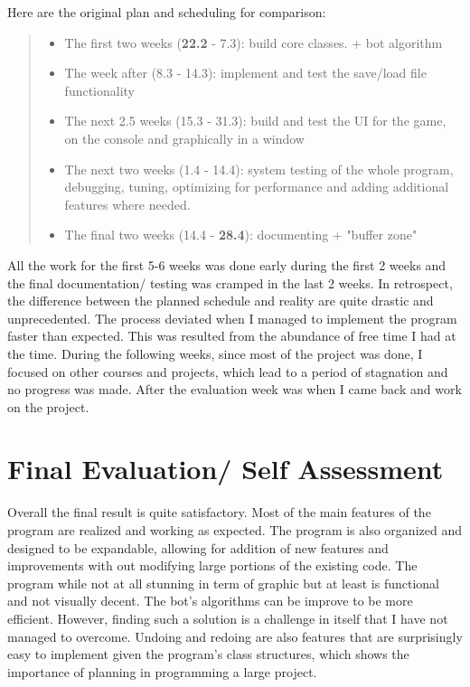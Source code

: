 \documentclass[12pt]{article}
\begin{document}
Here are the original plan and scheduling for comparison:
\begin{quote}
\begin{itemize}
  \item  The first two weeks (\textbf{22.2} - 7.3): build core classes.
    + bot algorithm 
  \item The week after (8.3 - 14.3): implement and test the save/load file
    functionality 
  \item  The next 2.5 weeks (15.3 - 31.3): build and test the UI for the game,
    on the console and graphically in a window
  \item  The next two weeks (1.4 -  14.4): system testing of
    the whole program, debugging, tuning, optimizing for performance and adding
    additional features where needed.
  \item The final two weeks (14.4 - \textbf{28.4}): documenting + "buffer zone"
\end{itemize}
\end{quote}

All the work for the first 5-6 weeks was done early during the first 2 weeks and
the final documentation/ testing was cramped in the last 2 weeks. In retrospect,
the difference between the planned schedule and reality are quite drastic and
unprecedented. The process deviated when I managed to implement the program
faster than expected. This was resulted from the abundance of free time I had at
the time. During the following weeks, since most of the project was done, I
focused on other courses and projects, which lead to a period of stagnation and
no progress was made. After the evaluation week was when I came back and work on
the project.

\section{Final Evaluation/ Self Assessment}

Overall the final result is quite satisfactory. Most of the main features of the
program are realized and working as expected. The program is also organized and
designed to be expandable, allowing for addition of new features and
improvements with out modifying large portions of the existing code. The program
while not at all stunning in term of graphic but at least is functional and not
visually decent. The bot's algorithms can be improve to be more efficient.
However, finding such a solution is a challenge in itself that I have not
managed to overcome.  Undoing and redoing are also features that are
surprisingly easy to implement given the program's class structures, which shows
the importance of planning in programming a large project.
\end{document}
